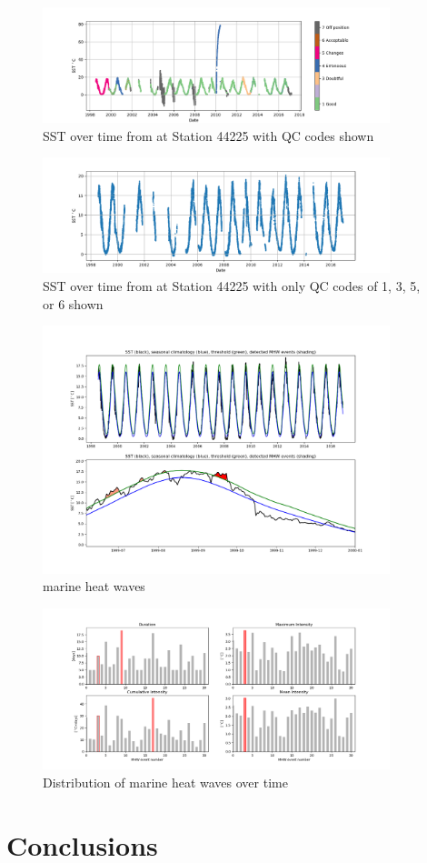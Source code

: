 \documentclass[12pt, letterpaper]{article}
\begin{document}
\begin{figure}
\includegraphics[width=0.9\textwidth]{qc_sst_timeseries}
\caption{SST over time from at Station 44225 with QC codes shown}
\label{fig:qc_sst_timeseries}
\end{figure}

\begin{figure}
\includegraphics[width=0.9\textwidth]{filtered_sst_timeseries}
\caption{SST over time from at Station 44225 with only QC codes of 1, 3, 5, or 6 shown}
\label{fig:filterd_sst_timeseries}
\end{figure}

\begin{figure}
\includegraphics[width=0.9\textwidth]{mhw_timeseries}
\caption{marine heat waves}
\label{fig:mhw_timeseries}
\end{figure}

\begin{figure}
\includegraphics[width=0.9\textwidth]{mhw_distribution}
\caption{Distribution of marine heat waves over time}
\label{fig:distribution}
\end{figure}



\section{Conclusions}


\end{document}
